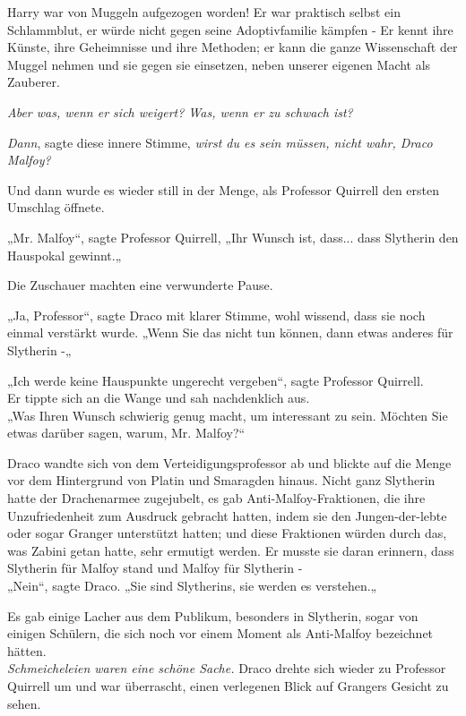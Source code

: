 {Harry war von Muggeln aufgezogen worden! Er war praktisch selbst ein Schlammblut, er würde nicht gegen seine Adoptivfamilie kämpfen - Er kennt ihre Künste, ihre Geheimnisse und ihre Methoden; er kann die ganze Wissenschaft der Muggel nehmen und sie gegen sie einsetzen, neben unserer eigenen Macht als Zauberer.

\emph{Aber was, wenn er sich weigert? Was, wenn er zu schwach ist?}

\emph{Dann}, sagte diese innere Stimme, \emph{wirst du es sein müssen, nicht wahr, Draco Malfoy?}

Und dann wurde es wieder still in der Menge, als Professor Quirrell den ersten Umschlag öffnete.

„Mr. Malfoy“, sagte Professor Quirrell, „Ihr Wunsch ist, dass... dass Slytherin den Hauspokal gewinnt.„

Die Zuschauer machten eine verwunderte Pause.

„Ja, Professor“, sagte Draco mit klarer Stimme, wohl wissend, dass sie noch einmal verstärkt wurde. „Wenn Sie das nicht tun können, dann etwas anderes für Slytherin -„

„Ich werde keine Hauspunkte ungerecht vergeben“, sagte Professor Quirrell.\\ Er tippte sich an die Wange und sah nachdenklich aus.\\ „Was Ihren Wunsch schwierig genug macht, um interessant zu sein. Möchten Sie etwas darüber sagen, warum, Mr. Malfoy?“

Draco wandte sich von dem Verteidigungsprofessor ab und blickte auf die Menge vor dem Hintergrund von Platin und Smaragden hinaus. Nicht ganz Slytherin hatte der Drachenarmee zugejubelt, es gab Anti-Malfoy-Fraktionen, die ihre Unzufriedenheit zum Ausdruck gebracht hatten, indem sie den Jungen-der-lebte oder sogar Granger unterstützt hatten; und diese Fraktionen würden durch das, was Zabini getan hatte, sehr ermutigt werden. Er musste sie daran erinnern, dass Slytherin für Malfoy stand und Malfoy für Slytherin -\\ „Nein“, sagte Draco. „Sie sind Slytherins, sie werden es verstehen.„

Es gab einige Lacher aus dem Publikum, besonders in Slytherin, sogar von einigen Schülern, die sich noch vor einem Moment als Anti-Malfoy bezeichnet hätten.\\ \emph{Schmeicheleien waren eine schöne Sache.} Draco drehte sich wieder zu Professor Quirrell um und war überrascht, einen verlegenen Blick auf Grangers Gesicht zu sehen.

}

